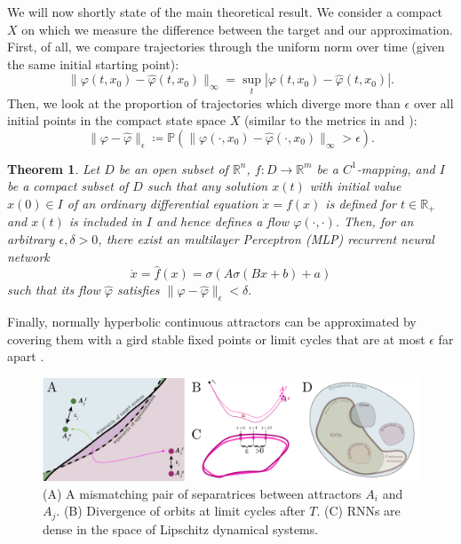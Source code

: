 \documentclass[10pt]{article}
\newtheorem{theorem}{Theorem}
\newcommand{\reals}{\mathbb{R}}
\begin{document}
We will now shortly state of the main theoretical result.
We consider a compact $X$ on which we measure the difference between the target and our approximation.
First, of all, we compare trajectories through the uniform norm over time (given the same initial starting point):
\begin{equation}
\|\varphi(t,x_0)-\hat \varphi(t,x_0)\|_\infty = \sup_t|\varphi(t,x_0)-\hat \varphi(t,x_0)|.
\end{equation}
Then, we look at the proportion of trajectories which diverge more than $\epsilon$ over all initial points in the compact state space $X$ (similar to the metrics in \citep{hammer2000approximation} and \citep{hanson2021learning}):
\begin{equation}
\|\varphi-\hat \varphi\|_\epsilon \coloneqq  \mathbb{P}\left(\|\varphi(\cdot,x_0)-\hat \varphi(\cdot,x_0)\|_\infty>\epsilon\right).
\end{equation}

\vspace{-.3cm}
\begin{theorem}
Let $D$ be an open subset of $\mathbb{R}^n$, $f\colon D \to \mathbb{R}^m$ be a $C^1$-mapping, and $I$ be a compact subset of $D$ such that any solution $x(t)$ with initial value $x(0) \in I$ of an ordinary differential equation $\dot{x} = f(x)$ is defined for $t\in\reals_{+}$ and $x(t)$ is included in $I$ and hence defines a flow $\varphi(\cdot, \cdot)$.
 Then, for an arbitrary $\epsilon, \delta > 0$, there exist an multilayer Perceptron (MLP) recurrent neural network 
 \begin{equation}
\dot x = \hat f(x) = \sigma(A\sigma(Bx+b)+a)
\end{equation}
such that its flow $\hat \varphi$ satisfies $\|\varphi-\hat \varphi\|_\epsilon < \delta.$
\end{theorem}

Finally, normally hyperbolic continuous attractors can be approximated by covering them with a gird stable fixed points or limit cycles that are at most $\epsilon$ far apart \citep{Sagodi2024a}.

\begin{figure}[tbhp]
  \centering
  \includegraphics[width=\textwidth]{icmns2025_figure}
  \caption{(A) 	A mismatching pair of separatrices between attractors $A_i$ and $A_j$.
  		(B) Divergence of orbits at limit cycles after $T$.
  		(C) RNNs are dense in the space of Lipschitz dynamical systems.
  }\label{fig:figure}
\end{figure}


\end{document}
